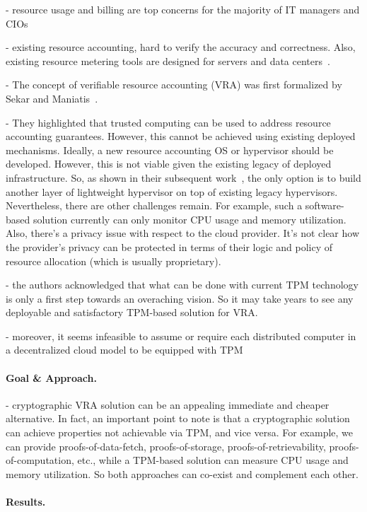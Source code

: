 - resource usage and billing are top concerns for the majority of IT managers and CIOs 

- existing resource accounting, hard to verify the accuracy and correctness. Also, existing resource metering tools are designed for servers and data centers~\cite{?}.

- The concept of verifiable resource accounting (VRA) was first formalized by Sekar and Maniatis~\cite{SM11}.

- They highlighted that trusted computing can be used to address resource accounting guarantees. However, this cannot be achieved using existing deployed mechanisms. Ideally, a new resource accounting OS or hypervisor should be developed. However, this is not viable given the existing legacy of deployed infrastructure. So, as shown in their subsequent work~\cite{CMP+13}, the only option is to build another layer of lightweight hypervisor on top of existing legacy hypervisors. Nevertheless, there are other challenges remain. For example, such a software-based solution currently can only monitor CPU usage and memory utilization. Also, there's a privacy issue with respect to the cloud provider. It's not clear how the provider's privacy can be protected in terms of their logic and policy of resource allocation (which is usually proprietary).

- the authors acknowledged that what can be done with current TPM technology is only a first step towards an overaching vision. So it may take years to see any deployable and satisfactory TPM-based solution for VRA.

- moreover, it seems infeasible to assume or require each distributed computer in a decentralized cloud model to be equipped with TPM

\paragraph{Goal \& Approach.}
- cryptographic VRA solution can be an appealing immediate and cheaper alternative. In fact, an important point to note is that a cryptographic solution can achieve properties not achievable via TPM, and vice versa. For example, we can provide proofs-of-data-fetch, proofs-of-storage, proofs-of-retrievability, proofs-of-computation, etc., while a TPM-based solution can measure CPU usage and memory utilization. So both approaches can co-exist and complement each other.


\paragraph{Results.}


